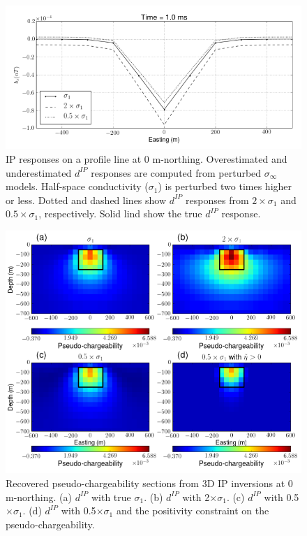 \documentclass[a4paper, 11pt]{article}
\newcommand{\siginf}{\sigma_\infty}
\newcommand{\dip}{d^{IP}}
\begin{document}
\begin{figure}[htb]
  \centering
  \includegraphics[width=1.\textwidth]{figures/Reg_IPresp.png}
  \caption{IP responses on a profile line at 0 m-northing. Overestimated and underestimated $\dip$ responses are computed from perturbed $\siginf$ models. Half-space conductivity ($\sigma_1$) is perturbed two times higher or less. Dotted and dashed lines show $\dip$ responses from $2 \times \sigma_1$ and $0.5 \times \sigma_1$, respectively. Solid lind show the true $\dip$ response. }
  \label{F:Reg_IPresp}
\end{figure}

\begin{figure}[htb]
  \centering
  \includegraphics[width=1.\textwidth]{figures/Regional_IPInv.png}
  \caption{Recovered pseudo-chargeability sections from 3D IP inversions at 0 m-northing. (a) $\dip$ with true $\sigma_1$. (b) $\dip$ with 2$\times \sigma_1$. (c) $\dip$ with 0.5$\times \sigma_1$. (d) $\dip$ with 0.5$\times \sigma_1$ and the positivity constraint on the pseudo-chargeability.}
  \label{F:Regional_IPInv}
\end{figure}
\end{document}
